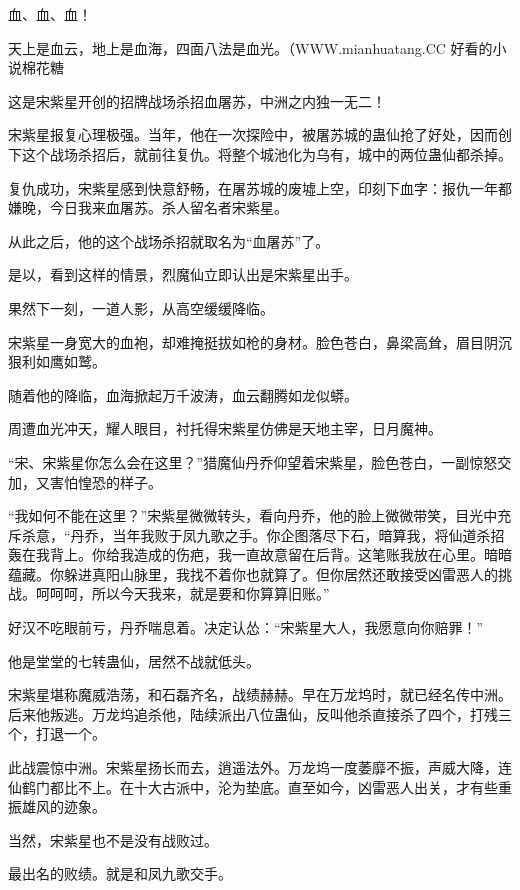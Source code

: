 
\begin{this_body}

血、血、血！

天上是血云，地上是血海，四面八法是血光。（WWW.mianhuatang.CC 好看的小说棉花糖

这是宋紫星开创的招牌战场杀招血屠苏，中洲之内独一无二！

宋紫星报复心理极强。当年，他在一次探险中，被屠苏城的蛊仙抢了好处，因而创下这个战场杀招后，就前往复仇。将整个城池化为乌有，城中的两位蛊仙都杀掉。

复仇成功，宋紫星感到快意舒畅，在屠苏城的废墟上空，印刻下血字：报仇一年都嫌晚，今日我来血屠苏。杀人留名者宋紫星。

从此之后，他的这个战场杀招就取名为“血屠苏”了。

是以，看到这样的情景，烈魔仙立即认出是宋紫星出手。

果然下一刻，一道人影，从高空缓缓降临。

宋紫星一身宽大的血袍，却难掩挺拔如枪的身材。脸色苍白，鼻梁高耸，眉目阴沉狠利如鹰如鹫。

随着他的降临，血海掀起万千波涛，血云翻腾如龙似蟒。

周遭血光冲天，耀人眼目，衬托得宋紫星仿佛是天地主宰，日月魔神。

“宋、宋紫星你怎么会在这里？”猎魔仙丹乔仰望着宋紫星，脸色苍白，一副惊怒交加，又害怕惶恐的样子。

“我如何不能在这里？”宋紫星微微转头，看向丹乔，他的脸上微微带笑，目光中充斥杀意，“丹乔，当年我败于凤九歌之手。你企图落尽下石，暗算我，将仙道杀招轰在我背上。你给我造成的伤疤，我一直故意留在后背。这笔账我放在心里。暗暗蕴藏。你躲进真阳山脉里，我找不着你也就算了。但你居然还敢接受凶雷恶人的挑战。呵呵呵，所以今天我来，就是要和你算算旧账。”

好汉不吃眼前亏，丹乔喘息着。决定认怂：“宋紫星大人，我愿意向你赔罪！”

他是堂堂的七转蛊仙，居然不战就低头。

宋紫星堪称魔威浩荡，和石磊齐名，战绩赫赫。早在万龙坞时，就已经名传中洲。后来他叛逃。万龙坞追杀他，陆续派出八位蛊仙，反叫他杀直接杀了四个，打残三个，打退一个。

此战震惊中洲。宋紫星扬长而去，逍遥法外。万龙坞一度萎靡不振，声威大降，连仙鹤门都比不上。在十大古派中，沦为垫底。直至如今，凶雷恶人出关，才有些重振雄风的迹象。

当然，宋紫星也不是没有战败过。

最出名的败绩。就是和凤九歌交手。


\end{this_body}
